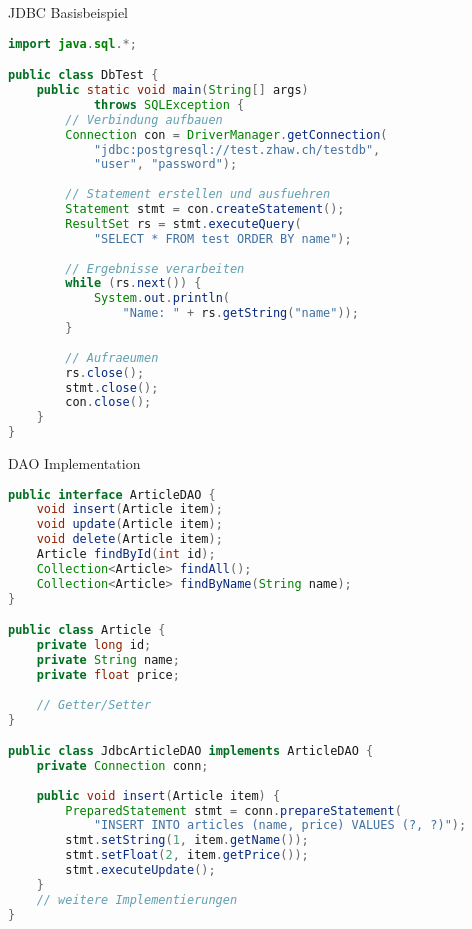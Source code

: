 \begin{example}{JDBC Basisbeispiel}
\begin{lstlisting}[language=Java, style=base]
import java.sql.*;

public class DbTest {
    public static void main(String[] args) 
            throws SQLException {
        // Verbindung aufbauen
        Connection con = DriverManager.getConnection(
            "jdbc:postgresql://test.zhaw.ch/testdb",
            "user", "password");
            
        // Statement erstellen und ausfuehren
        Statement stmt = con.createStatement();
        ResultSet rs = stmt.executeQuery(
            "SELECT * FROM test ORDER BY name");
            
        // Ergebnisse verarbeiten
        while (rs.next()) {
            System.out.println(
                "Name: " + rs.getString("name"));
        }
        
        // Aufraeumen
        rs.close();
        stmt.close();
        con.close();
    }
}
\end{lstlisting}
\end{example}

\begin{example2}{DAO Implementation}
\begin{lstlisting}[language=Java, style=base]
public interface ArticleDAO {
    void insert(Article item);
    void update(Article item);
    void delete(Article item);
    Article findById(int id);
    Collection<Article> findAll();
    Collection<Article> findByName(String name);
}

public class Article {
    private long id;
    private String name;
    private float price;
    
    // Getter/Setter
}

public class JdbcArticleDAO implements ArticleDAO {
    private Connection conn;
    
    public void insert(Article item) {
        PreparedStatement stmt = conn.prepareStatement(
            "INSERT INTO articles (name, price) VALUES (?, ?)");
        stmt.setString(1, item.getName());
        stmt.setFloat(2, item.getPrice());
        stmt.executeUpdate();
    }
    // weitere Implementierungen
}
\end{lstlisting}
\end{example2}

